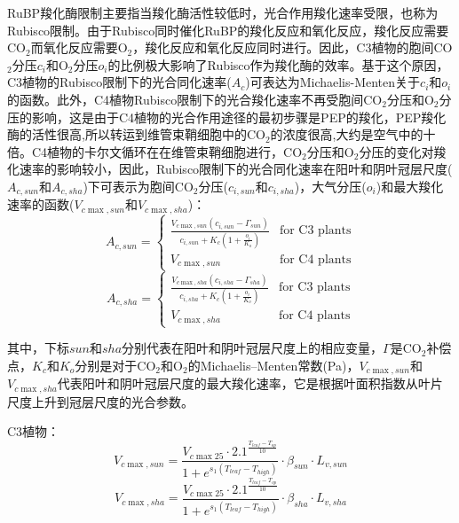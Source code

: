 RuBP羧化酶限制主要指当羧化酶活性较低时，光合作用羧化速率受限，也称为Rubisco限制。由于Rubisco同时催化RuBP的羧化反应和氧化反应，羧化反应需要CO$_2$而氧化反应需要O$_2$，羧化反应和氧化反应同时进行。因此，C3植物的胞间CO$_2$分压$c_i$和O$_2$分压$o_i$的比例极大影响了Rubisco作为羧化酶的效率。基于这个原因，C3植物的Rubisco限制下的光合同化速率($A_c$)可表达为Michaelis-Menten关于$c_i$和$o_i$的函数。此外，C4植物Rubisco限制下的光合羧化速率不再受胞间CO$_2$分压和O$_2$分压的影响，这是由于C4植物的光合作用途径的最初步骤是PEP的羧化，PEP羧化酶的活性很高,所以转运到维管束鞘细胞中的CO$_2$的浓度很高,大约是空气中的十倍。C4植物的卡尔文循环在在维管束鞘细胞进行，CO$_2$分压和O$_2$分压的变化对羧化速率的影响较小，因此，Rubisco限制下的光合同化速率在阳叶和阴叶冠层尺度($A_{c,sun}$和$A_{c,sha}$)下可表示为胞间CO$_2$分压($c_{i,sun}$和$c_{i,sha}$)，大气分压($o_{i}$)和最大羧化速率的函数($V_{c \max,sun}$和$V_{c \max,sha}$)：
\begin{equation}\label{A_C1sun}
A_{c,sun}=\begin{cases}
\frac{V_{c \max,sun}\left(c_{i,sun}-\Gamma_{sun}\right)}{c_{i,sun}+K_{c}\left(1+\frac{o_{i}}{K_{o}}\right)}
     & \text{for C3 plants} \\ 
V_{c \max,sun } & \text{for C4 plants}
\end{cases}
\end{equation}
\begin{equation}\label{A_C1sha}
A_{c,sha}=\begin{cases}
\frac{V_{c \max,sha}\left(c_{i,sha}-\Gamma_{sha}\right)}{c_{i,sha}+K_{c}\left(1+\frac{o_{i}}{K_{o}}\right)}
     & \text{for C3 plants} \\ 
V_{c \max,sha } & \text{for C4 plants}
\end{cases}
\end{equation}

其中，下标$sun$和$sha$分别代表在阳叶和阴叶冠层尺度上的相应变量，$\Gamma$是CO$_2$补偿点，$K_c$和$K_o$分别是对于CO$_2$和O$_2$的Michaelis--Menten常数(Pa)，$V_{c \max,sun}$和$V_{c \max,sha}$代表阳叶和阴叶冠层尺度的最大羧化速率，它是根据叶面积指数从叶片尺度上升到冠层尺度的光合参数。

C3植物：
\begin{equation}\label{V_cmaxsun_a}
V_{c \max,sun }=\frac{V_{c \max 25} \cdot 2.1^{\frac{T_{{leaf }}-T_{o p}}{10}}}{1+e^{s_{1}\left(T_{{leaf }}-T_{{high }}\right)}} \cdot \beta_{sun} \cdot L_{v,sun}
\end{equation}
\begin{equation}\label{V_cmaxsha_a}
V_{c \max,sha }=\frac{V_{c \max 25} \cdot 2.1^{\frac{T_{{leaf }}-T_{o p}}{10}}}{1+e^{s_{1}\left(T_{{leaf }}-T_{{high }}\right)}} \cdot \beta_{sha} \cdot L_{v,sha}
\end{equation}

